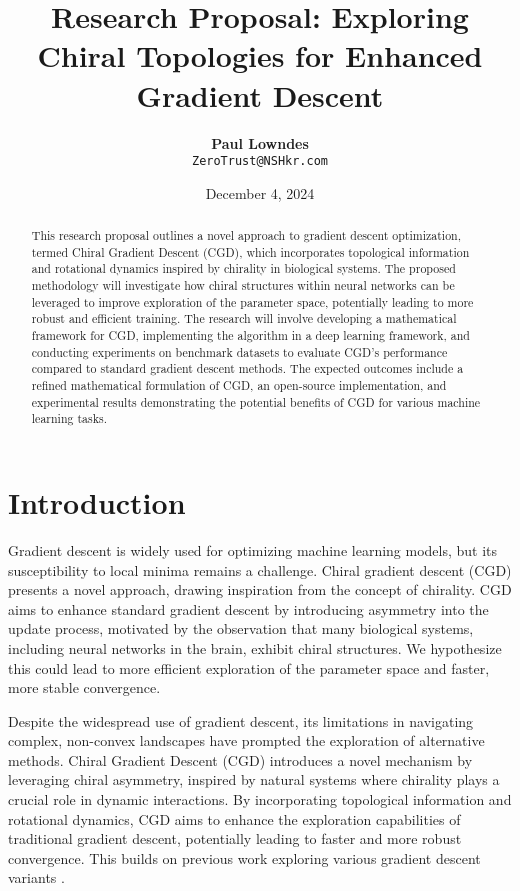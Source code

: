 \documentclass[12pt, a4paper]{article}
\title{\vspace{-2cm}\textbf{Research Proposal: Exploring Chiral Topologies for Enhanced Gradient Descent}}
\author{\textbf{Paul Lowndes} \\ \texttt{ZeroTrust@NSHkr.com}}
\date{\small December 4, 2024} %
\begin{document}
\maketitle
\vspace{-1.5em} %

\begin{abstract}
This research proposal outlines a novel approach to gradient descent optimization, termed Chiral Gradient Descent (CGD), which incorporates topological information and rotational dynamics inspired by chirality in biological systems. The proposed methodology will investigate how chiral structures within neural networks can be leveraged to improve exploration of the parameter space, potentially leading to more robust and efficient training. The research will involve developing a mathematical framework for CGD, implementing the algorithm in a deep learning framework, and conducting experiments on benchmark datasets to evaluate CGD's performance compared to standard gradient descent methods. The expected outcomes include a refined mathematical formulation of CGD, an open-source implementation, and experimental results demonstrating the potential benefits of CGD for various machine learning tasks.
\end{abstract}

\section{Introduction}

Gradient descent is widely used for optimizing machine learning models, but its susceptibility to local minima remains a challenge. Chiral gradient descent (CGD) presents a novel approach, drawing inspiration from the concept of chirality. CGD aims to enhance standard gradient descent by introducing asymmetry into the update process, motivated by the observation that many biological systems, including neural networks in the brain, exhibit chiral structures. We hypothesize this could lead to more efficient exploration of the parameter space and faster, more stable convergence.

Despite the widespread use of gradient descent, its limitations in navigating complex, non-convex landscapes have prompted the exploration of alternative methods. Chiral Gradient Descent (CGD) introduces a novel mechanism by leveraging chiral asymmetry, inspired by natural systems where chirality plays a crucial role in dynamic interactions. By incorporating topological information and rotational dynamics, CGD aims to enhance the exploration capabilities of traditional gradient descent, potentially leading to faster and more robust convergence.  This builds on previous work exploring various gradient descent variants \cite{induraj2023variants}.
\end{document}
